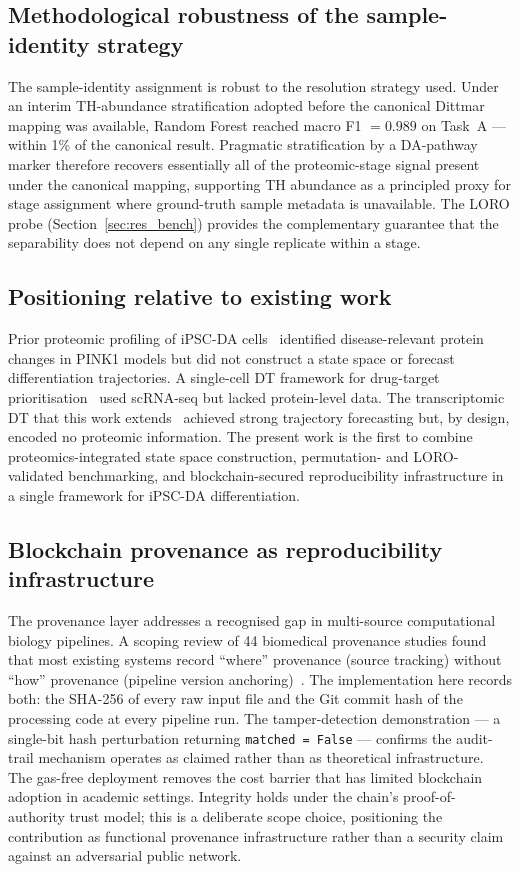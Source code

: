 \documentclass[5p,times,twocolumn]{elsarticle}
\begin{document}
\subsection{\textbf{Methodological robustness of the
sample-identity strategy}}

The sample-identity assignment is robust to the resolution
strategy used.
Under an interim TH-abundance stratification adopted before the
canonical Dittmar mapping was available, Random Forest reached
macro F1 $= 0.989$ on Task~A --- within 1\% of the canonical
result.
Pragmatic stratification by a DA-pathway marker therefore
recovers essentially all of the proteomic-stage signal present
under the canonical mapping, supporting TH abundance as a
principled proxy for stage assignment where ground-truth sample
metadata is unavailable.
The LORO probe (Section~\ref{sec:res_bench}) provides the
complementary guarantee that the separability does not depend on
any single replicate within a stage.

\subsection{\textbf{Positioning relative to existing work}}

Prior proteomic profiling of iPSC-DA
cells~\cite{novak2022single} identified disease-relevant protein
changes in PINK1 models but did not construct a state space or
forecast differentiation trajectories.
A single-cell DT framework for drug-target
prioritisation~\cite{li2022dynamic} used scRNA-seq but lacked
protein-level data.
The transcriptomic DT that this work
extends~\cite{kanu2026transformer} achieved strong trajectory
forecasting but, by design, encoded no proteomic information.
The present work is the first to combine proteomics-integrated
state space construction, permutation- and LORO-validated
benchmarking, and blockchain-secured reproducibility
infrastructure in a single framework for iPSC-DA
differentiation.

\subsection{\textbf{Blockchain provenance as reproducibility
infrastructure}}

The provenance layer addresses a recognised gap in multi-source
computational biology pipelines.
A scoping review of 44 biomedical provenance studies found that
most existing systems record ``where'' provenance (source
tracking) without ``how'' provenance (pipeline version
anchoring)~\cite{johns2023data}.
The implementation here records both: the SHA-256 of every raw
input file and the Git commit hash of the processing code at
every pipeline run.
The tamper-detection demonstration --- a single-bit hash
perturbation returning \texttt{matched = False} --- confirms the
audit-trail mechanism operates as claimed rather than as
theoretical infrastructure.
The gas-free deployment removes the cost barrier that has
limited blockchain adoption in academic settings.
Integrity holds under the chain's proof-of-authority trust
model; this is a deliberate scope choice, positioning the
contribution as functional provenance infrastructure rather than
a security claim against an adversarial public network.
\end{document}
